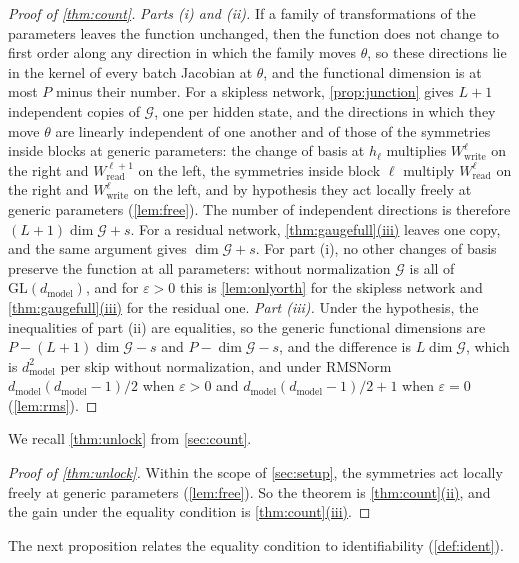 \documentclass[10pt]{article}
\theoremstyle{definition}
\theoremstyle{remark}
\newcommand{\Wread}{W_{\mathrm{read}}}
\newcommand{\Wwrite}{W_{\mathrm{write}}}
\newcommand{\dm}{d_{\mathrm{model}}}
\newcommand{\GL}{\mathrm{GL}}
\newcommand{\G}{\mathcal{G}}
\DeclareRobustCommand{\cpref}[2]{\hyperref[#1:#2]{\cref*{#1}(#2)}}
\begin{document}
\begin{proof}[Proof of \cref{thm:count}]
\emph{Parts (i) and (ii).} If a family of transformations of the parameters leaves the function unchanged, then the function does not change to first order along any direction in which the family moves $\theta$, so these directions lie in the kernel of every batch Jacobian at $\theta$, and the functional dimension is at most $P$ minus their number. For a skipless network, \cref{prop:junction} gives $L+1$ independent copies of $\G$, one per hidden state, and the directions in which they move $\theta$ are linearly independent of one another and of those of the symmetries inside blocks at generic parameters: the change of basis at $h_{\ell}$ multiplies $\Wwrite^{\ell}$ on the right and $\Wread^{\ell+1}$ on the left, the symmetries inside block $\ell$ multiply $\Wread^{\ell}$ on the right and $\Wwrite^{\ell}$ on the left, and by hypothesis they act locally freely at generic parameters (\cref{lem:free}). The number of independent directions is therefore $(L+1)\dim\G + s$. For a residual network, \cpref{thm:gaugefull}{iii} leaves one copy, and the same argument gives $\dim\G + s$. For part (i), no other changes of basis preserve the function at all parameters: without normalization $\G$ is all of $\GL(\dm)$, and for $\varepsilon > 0$ this is \cref{lem:onlyorth} for the skipless network and \cpref{thm:gaugefull}{iii} for the residual one.
\emph{Part (iii).} Under the hypothesis, the inequalities of part (ii) are equalities, so the generic functional dimensions are $P - (L+1)\dim\G - s$ and $P - \dim\G - s$, and the difference is $L\dim\G$, which is $\dm^2$ per skip without normalization, and under RMSNorm $\dm(\dm-1)/2$ when $\varepsilon > 0$ and $\dm(\dm-1)/2 + 1$ when $\varepsilon = 0$ (\cref{lem:rms}).
\end{proof}



We recall \cref{thm:unlock} from \cref{sec:count}.
\thmUnlock*

\begin{proof}[Proof of \cref{thm:unlock}]
Within the scope of \cref{sec:setup}, the symmetries act locally freely at generic parameters (\cref{lem:free}). So the theorem is \cpref{thm:count}{ii}, and the gain under the equality condition is \cpref{thm:count}{iii}.
\end{proof}

The next proposition relates the equality condition to identifiability (\cref{def:ident}).

\propLocalId*
\end{document}
